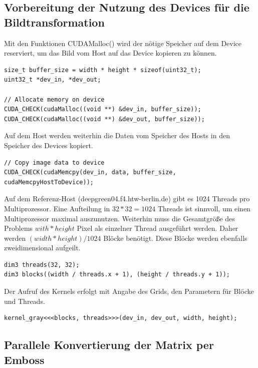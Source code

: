 \documentclass{llncs}
\begin{document}
\subsection{Vorbereitung der Nutzung des Devices für die Bildtransformation}
%

Mit den Funktionen CUDAMalloc() wird der nötige Speicher auf dem Device reserviert, um das Bild vom Host auf das Device kopieren zu können.

\begin{lstlisting}
size_t buffer_size = width * height * sizeof(uint32_t);
uint32_t *dev_in, *dev_out;

// Allocate memory on device
CUDA_CHECK(cudaMalloc((void **) &dev_in, buffer_size));
CUDA_CHECK(cudaMalloc((void **) &dev_out, buffer_size));
\end{lstlisting}
\vspace*{0.5cm}
Auf dem Host werden weiterhin die Daten vom Speicher des Hosts in den Speicher des Devices kopiert.

\begin{lstlisting}[]
// Copy image data to device
CUDA_CHECK(cudaMemcpy(dev_in, data, buffer_size, cudaMemcpyHostToDevice));
\end{lstlisting}
\vspace*{0.5cm}
Auf dem Referenz-Host (deepgreen04.f4.htw-berlin.de) gibt es 1024 Threads pro Multiprozessor. Eine Aufteilung in $32 * 32 = 1024$ Threads ist sinnvoll, um einen Multiprozessor maximal auszunutzen. Weiterhin muss die Gesamtgröße des Problems $with * height$ Pixel als einzelner Thread ausgeführt werden. Daher werden $(width * height) / 1024$ Blöcke benötigt. Diese Blöcke werden ebenfalls zweidimensional aufgeilt.

\begin{lstlisting}
dim3 threads(32, 32);
dim3 blocks((width / threads.x + 1), (height / threads.y + 1));
\end{lstlisting}
\vspace*{0.5cm}
Der Aufruf des Kernels erfolgt mit Angabe des Grids, den Parametern für Blöcke und Threads.

\begin{lstlisting}
kernel_gray<<<blocks, threads>>>(dev_in, dev_out, width, height);
\end{lstlisting}

\newpage
\subsection{Parallele Konvertierung der Matrix per Emboss}
%
\end{document}
